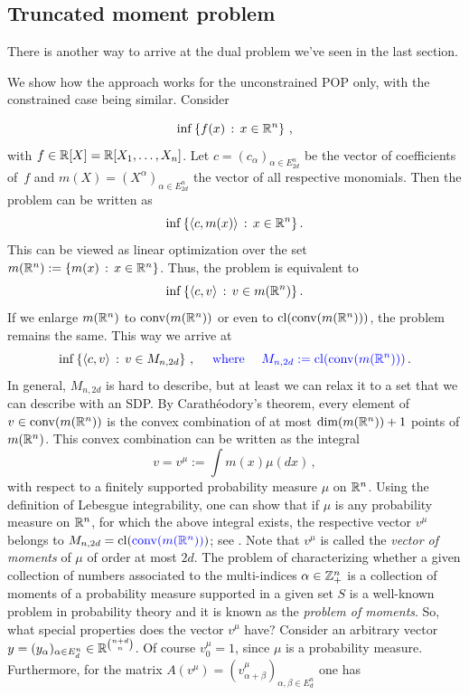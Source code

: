 \subsection{Truncated moment problem}

There is another way to arrive at the dual problem we've seen in the last section. 

We show how the approach works for the unconstrained POP only, with the constrained case being similar.
Consider

\begin{equation}
	\label{our:inf:problem}
	\inf \left\{ f(x)  \,:\, x \in \mathbb{R}^n \right\}\,,
\end{equation}
with $f \in \mathbb{R}[X]=\mathbb{R}[X_1,\ldots,X_n]$. Let $c = (c_\alpha)_{\alpha \in E_{2d}^n}$ be the vector of coefficients of~$f$ and $m(X) = (X^\alpha)_{\alpha \in E_{2d}^n}$ the vector of all respective monomials. Then the problem can be written as 
\begin{equation}
	\inf \left\{  \left\langle c , m(x) \right\rangle  \,:\, x \in \mathbb{R}^n \right\}.
\end{equation}
This can be viewed as linear optimization over the set $m(\mathbb{R}^n):=\left\{ m(x) \,:\, x \in \mathbb{R}^n \right\}$. Thus, the problem is equivalent to
\begin{equation}
	\inf \left\{ \left\langle c , v \right\rangle \,:\, v \in m(\mathbb{R}^n) \right\}.
\end{equation}
If we enlarge $m(\mathbb{R}^n)$ to $\operatorname{conv}(m(\mathbb{R}^n))$ or even to $\operatorname{cl}(\operatorname{conv}(m(\mathbb{R}^n)))$, the problem remains the same. This way we arrive at 
\begin{equation}
	\label{lin:probl:on:M}
	\inf \left\{ \left\langle c , v \right\rangle \,:\,  v \in M_{n,2d} \right\}\,, \quad \textcolor{blue}{\textrm{ where } \quad M_{n,2d} := \operatorname{cl}(\operatorname{conv}(m(\mathbb{R}^n)))} \,.
\end{equation}
In general, $M_{n,2d}$ is hard to describe, but at least we can relax it to a set that we can describe with an SDP. By Carath\'{e}odory's theorem, every element of $v \in \operatorname{conv}(m(\mathbb{R}^n))$ is the convex combination of at most $\dim(m(\mathbb{R}^n))+1$ points of $m(\mathbb{R}^n)$. This convex combination can be written as the integral
\[
	v = v^\mu:= \int m(x) \mu( d x) \,,
\]
with respect to a finitely supported probability measure $\mu$ on $\mathbb{R}^n$. Using the definition of Lebesgue integrability, one can show that if $\mu$ is any probability measure on $\mathbb{R}^n$, for which the above integral exists, the respective vector $v^\mu$ belongs to $M_{n,2d}=\operatorname{cl}(\textcolor{blue}{\operatorname{conv}(m(\mathbb{R}^n))})$; see \cite[Definitions~11.21, 11.22]{Rudin}. Note that $v^\mu$ is called the \emph{vector of moments} of $\mu$ of order at most $2d$. The problem of characterizing whether a given collection of numbers associated to the multi-indices $\alpha \in \mathbb{Z}_+^n$ is a collection of moments of a probability measure supported in a given set $S$ is a well-known problem in probability theory and it is known as the \emph{problem of moments}. So, what special properties does the vector $v^\mu$ have? Consider an arbitrary vector $y=(y_\alpha)_{\alpha \in E_d^n} \in \mathbb{R}^{\binom{n+d}{n}}$. Of course $v^\mu_0=1$, since $\mu$ is a probability measure. Furthermore, for the matrix $A(v^\mu) = (v^\mu_{\alpha+\beta})_{\alpha,\beta \in E_d^n}$ one has
